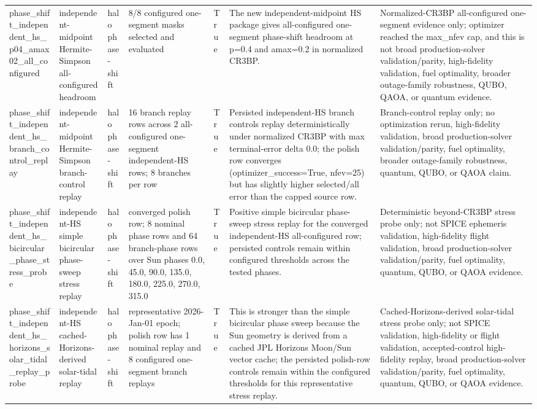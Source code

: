\begin{tabular}{lllllll}
phase\_shift\_independent\_hs\_p04\_amax02\_all\_configured & independent-midpoint Hermite-Simpson all-configured headroom & halo phase-shift & 8/8 configured one-segment masks selected and evaluated & True & The new independent-midpoint HS package gives all-configured one-segment phase-shift headroom at p=0.4 and amax=0.2 in normalized CR3BP. & Normalized-CR3BP all-configured one-segment evidence only; optimizer reached the max\_nfev cap, and this is not broad production-solver validation/parity, high-fidelity validation, fuel optimality, broader outage-family robustness, QUBO, QAOA, or quantum evidence. \\
phase\_shift\_independent\_hs\_branch\_control\_replay & independent-midpoint Hermite-Simpson branch-control replay & halo phase-shift & 16 branch replay rows across 2 all-configured one-segment independent-HS rows; 8 branches per row & True & Persisted independent-HS branch controls replay deterministically under normalized CR3BP with max terminal-error delta 0.0; the polish row converges (optimizer\_success=True, nfev=25) but has slightly higher selected/all error than the capped source row. & Branch-control replay only; no optimization rerun, high-fidelity validation, broad production-solver validation/parity, fuel optimality, broader outage-family robustness, quantum, QUBO, or QAOA claim. \\
phase\_shift\_independent\_hs\_bicircular\_phase\_stress\_probe & independent-HS simple bicircular phase-sweep stress replay & halo phase-shift & converged polish row; 8 nominal phase rows and 64 branch-phase rows over Sun phases 0.0, 45.0, 90.0, 135.0, 180.0, 225.0, 270.0, 315.0 & True & Positive simple bicircular phase-sweep stress replay for the converged independent-HS all-configured row; persisted controls remain within configured thresholds across the tested phases. & Deterministic beyond-CR3BP stress probe only; not SPICE ephemeris validation, high-fidelity flight validation, broad production-solver validation/parity, fuel optimality, quantum, QUBO, or QAOA evidence. \\
phase\_shift\_independent\_hs\_horizons\_solar\_tidal\_replay\_probe & independent-HS cached-Horizons-derived solar-tidal replay & halo phase-shift & representative 2026-Jan-01 epoch; polish row has 1 nominal replay and 8 configured one-segment branch replays & True & This is stronger than the simple bicircular phase sweep because the Sun geometry is derived from a cached JPL Horizons Moon/Sun vector cache; the persisted polish-row controls remain within the configured thresholds for this representative stress replay. & Cached-Horizons-derived solar-tidal stress probe only; not SPICE validation, high-fidelity or flight validation, accepted-control high-fidelity replay, broad production-solver validation/parity, fuel optimality, quantum, QUBO, or QAOA evidence. \\

\end{tabular}
